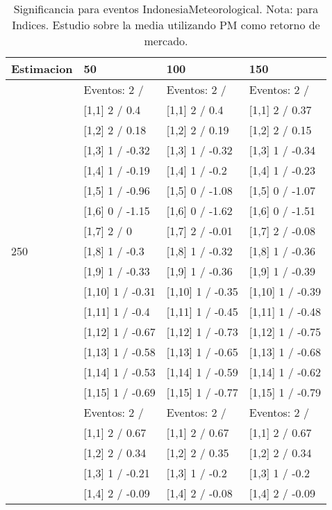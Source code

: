 \begin{table}

\caption{Significancia para eventos IndonesiaMeteorological. Nota: para Indices. Estudio sobre la media utilizando PM como retorno de mercado.}
\centering
\begin{tabular}[t]{llll}
\toprule
Estimacion & 50 & 100 & 150\\
\midrule
 & Eventos:  2 / & Eventos:  2 / & Eventos:  2 /\\
 & {}[1,1] 2  / 0.4 & {}[1,1] 2  / 0.4 & {}[1,1] 2  / 0.37\\
 & {}[1,2] 2  / 0.18 & {}[1,2] 2  / 0.19 & {}[1,2] 2  / 0.15\\
 & {}[1,3] 1  / -0.32 & {}[1,3] 1  / -0.32 & {}[1,3] 1  / -0.34\\
 & {}[1,4] 1  / -0.19 & {}[1,4] 1  / -0.2 & {}[1,4] 1  / -0.23\\
\addlinespace
 & {}[1,5] 1  / -0.96 & {}[1,5] 0  / -1.08 & {}[1,5] 0  / -1.07\\
 & {}[1,6] 0  / -1.15 & {}[1,6] 0  / -1.62 & {}[1,6] 0  / -1.51\\
 & {}[1,7] 2  / 0 & {}[1,7] 2  / -0.01 & {}[1,7] 2  / -0.08\\
250 & {}[1,8] 1  / -0.3 & {}[1,8] 1  / -0.32 & {}[1,8] 1  / -0.36\\
 & {}[1,9] 1  / -0.33 & {}[1,9] 1  / -0.36 & {}[1,9] 1  / -0.39\\
\addlinespace
 & {}[1,10] 1  / -0.31 & {}[1,10] 1  / -0.35 & {}[1,10] 1  / -0.39\\
 & {}[1,11] 1  / -0.4 & {}[1,11] 1  / -0.45 & {}[1,11] 1  / -0.48\\
 & {}[1,12] 1  / -0.67 & {}[1,12] 1  / -0.73 & {}[1,12] 1  / -0.75\\
 & {}[1,13] 1  / -0.58 & {}[1,13] 1  / -0.65 & {}[1,13] 1  / -0.68\\
 & {}[1,14] 1  / -0.53 & {}[1,14] 1  / -0.59 & {}[1,14] 1  / -0.62\\
\addlinespace
 & {}[1,15] 1  / -0.69 & {}[1,15] 1  / -0.77 & {}[1,15] 1  / -0.79\\
 & Eventos:  2 / & Eventos:  2 / & Eventos:  2 /\\
 & {}[1,1] 2  / 0.67 & {}[1,1] 2  / 0.67 & {}[1,1] 2  / 0.67\\
 & {}[1,2] 2  / 0.34 & {}[1,2] 2  / 0.35 & {}[1,2] 2  / 0.34\\
 & {}[1,3] 1  / -0.21 & {}[1,3] 1  / -0.2 & {}[1,3] 1  / -0.2\\
\addlinespace
 & {}[1,4] 2  / -0.09 & {}[1,4] 2  / -0.08 & {}[1,4] 2  / -0.09\\

\end{tabular}
\end{table}
